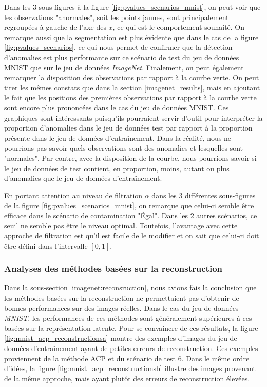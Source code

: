 Dans les 3 sous-figures à la figure \ref{fig:pvalues_scenarios_mnist}, on peut voir que les observations "anormales", soit les points jaunes, sont principalement regroupées à gauche de l'axe des $x$, ce qui est le comportement souhaité. On remarque aussi que la segmentation est plus évidente que dans le cas de la figure \ref{fig:pvalues_scenarios}, ce qui nous permet de confirmer que la détection d'anomalies est plus performante sur ce scénario de test du jeu de données MNIST que sur le jeu de données \textit{ImageNet}. Finalement, on peut également remarquer la disposition des observations par rapport à la courbe verte. On peut tirer les mêmes constats que dans la section \ref{imagenet_results}, mais en ajoutant le fait que les positions des premières observations par rapport à la courbe verte sont encore plus prononcées dans le cas du jeu de données MNIST. Ces graphiques sont intéressants puisqu'ils pourraient servir d'outil pour interpréter la proportion d'anomalies dans le jeu de données test par rapport à la proportion présente dans le jeu de données d'entraînement. Dans la réalité, nous ne pourrions pas savoir quels observations sont des anomalies et lesquelles sont "normales". Par contre, avec la disposition de la courbe, nous pourrions savoir si le jeu de données de test contient, en proportion, moins, autant ou plus d'anomalies que le jeu de données d'entraînement.

En portant attention au niveau de filtration $\alpha$ dans les 3 différentes sous-figures de la figure \ref{fig:pvalues_scenarios_mnist}, on remarque que celui-ci semble être efficace dans le scénario de contamination "Égal". Dans les 2 autres scénarios, ce seuil ne semble pas être le niveau optimal. Toutefois, l'avantage avec cette approche de filtration est qu'il est facile de le modifier et on sait que celui-ci doit être défini dans l'intervalle $[0, 1]$.

\subsubsection{Analyses des méthodes basées sur la reconstruction} \label{mnist:reconsruction}

Dans la sous-section \ref{imagenet:reconsruction}, nous avions fais la conclusion que les méthodes basées sur la reconstruction ne permettaient pas d'obtenir de bonnes performances sur des images réelles. Dans le cas du jeu de données \textit{MNIST}, les performances de ces méthodes sont généralement supérieures à ces basées sur la représentation latente. Pour se convaincre de ces résultats, la figure \ref{fig:mnist_acp_reconstructionsa} montre des exemples d'images du jeu de données d'entraînement ayant de petites erreurs de reconstruction. Ces exemples proviennent de la méthode ACP et du scénario de test 6.  Dans le même ordre d'idées, la figure \ref{fig:mnist_acp_reconstructionsb} illustre des images provenant de la même approche, mais ayant plutôt des erreurs de reconstruction élevées. 

